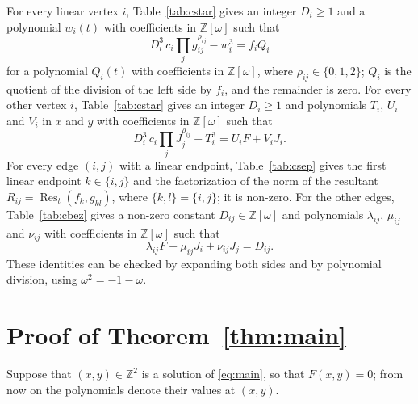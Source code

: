 \documentclass[11pt]{article}
\newcommand{\Z}{\mathbb{Z}}
\begin{document}
For every linear vertex $i$, Table~\ref{tab:cstar} gives an integer $D_i\geq1$ and a polynomial $w_i(t)$ with coefficients in $\Z[\omega]$ such that
\begin{equation}\label{eq:cstarlin}
D_i^3\,c_i\prod_jg_{ij}^{\rho_{ij}}-w_i^3=f_iQ_i
\end{equation}
for a polynomial $Q_i(t)$ with coefficients in $\Z[\omega]$, where $\rho_{ij}\in\{0,1,2\}$; $Q_i$ is the quotient of the division of the left side by $f_i$, and the remainder is zero.
For every other vertex $i$, Table~\ref{tab:cstar} gives an integer $D_i\geq1$ and polynomials $T_i$, $U_i$ and $V_i$ in $x$ and $y$ with coefficients in $\Z[\omega]$ such that
\begin{equation}\label{eq:cstar}
D_i^3\,c_i\prod_jJ_j^{\rho_{ij}}-T_i^3=U_iF+V_iJ_i.
\end{equation}
For every edge $(i,j)$ with a linear endpoint, Table~\ref{tab:csep} gives the first linear endpoint $k\in\{i,j\}$ and the factorization of the norm of the resultant $R_{ij}=\operatorname{Res}_t(f_k,g_{kl})$, where $\{k,l\}=\{i,j\}$; it is non-zero.
For the other edges, Table~\ref{tab:cbez} gives a non-zero constant $D_{ij}\in\Z[\omega]$ and polynomials $\lambda_{ij}$, $\mu_{ij}$ and $\nu_{ij}$ with coefficients in $\Z[\omega]$ such that
\begin{equation}\label{eq:csep}
\lambda_{ij}F+\mu_{ij}J_i+\nu_{ij}J_j=D_{ij}.
\end{equation}
These identities can be checked by expanding both sides and by polynomial division, using $\omega^2=-1-\omega$.

\section{Proof of Theorem~\ref{thm:main}}

Suppose that $(x,y)\in\Z^2$ is a solution of \eqref{eq:main}, so that $F(x,y)=0$; from now on the polynomials denote their values at $(x,y)$.
\end{document}
